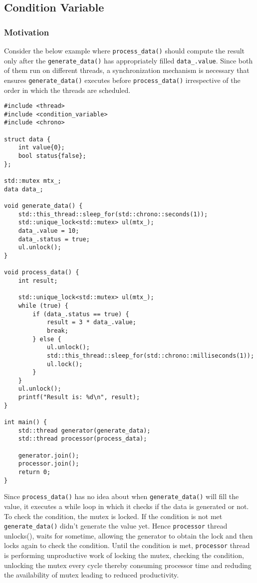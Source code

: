 \documentclass{scrartcl}
\begin{document}
\subsection{Condition Variable}
\subsubsection{Motivation}
Consider the below example where \texttt{process_data()} should compute the result only after the \texttt{generate_data()} has appropriately filled \texttt{data_.value}. Since both of them run on different threads, a synchronization mechanism is necessary that ensures \texttt{generate_data()} executes before \texttt{process_data()} irrespective of the order in which the threads are scheduled.

\begin{verbatim}
#include <thread>
#include <condition_variable>
#include <chrono>

struct data {
    int value{0};
    bool status{false};
};

std::mutex mtx_;
data data_;

void generate_data() {
    std::this_thread::sleep_for(std::chrono::seconds(1));
    std::unique_lock<std::mutex> ul(mtx_);
    data_.value = 10;
    data_.status = true;
    ul.unlock();
}

void process_data() {
    int result;

    std::unique_lock<std::mutex> ul(mtx_);
    while (true) {
        if (data_.status == true) {
            result = 3 * data_.value;
            break;
        } else {
            ul.unlock();
            std::this_thread::sleep_for(std::chrono::milliseconds(1));
            ul.lock();
        }
    }
    ul.unlock();
    printf("Result is: %d\n", result);
}

int main() {
    std::thread generator(generate_data);
    std::thread processor(process_data);

    generator.join();
    processor.join();
    return 0;
}
\end{verbatim}

Since \texttt{process_data()} has no idea about when \texttt{generate_data()} will fill the value, it executes a while loop in which it checks if the data is generated or not. To check the condition, the mutex is locked. If the condition is not met \texttt{generate_data()} didn't generate the value yet. Hence \texttt{processor} thread unlocks(), waits for sometime, allowing the generator to obtain the lock and then locks again to check the condition. Until the condition is met, \texttt{processor} thread is performing unproductive work of locking the mutex, checking the condition, unlocking the mutex every cycle thereby consuming processor time and reduding the availability of mutex leading to reduced productivity.
\end{document}
